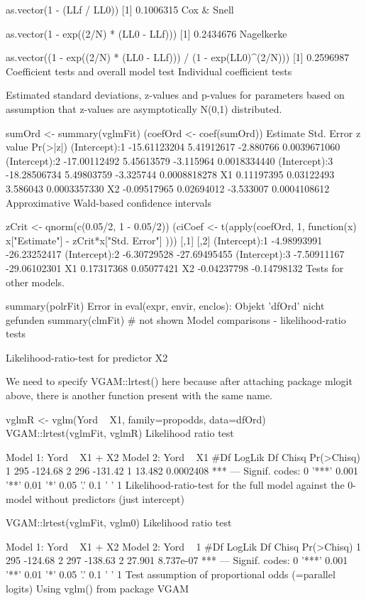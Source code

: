 as.vector(1 - (LLf / LL0))
[1] 0.1006315
Cox & Snell

as.vector(1 - exp((2/N) * (LL0 - LLf)))
[1] 0.2434676
Nagelkerke

as.vector((1 - exp((2/N) * (LL0 - LLf))) / (1 - exp(LL0)^(2/N)))
[1] 0.2596987
Coefficient tests and overall model test
Individual coefficient tests

Estimated standard deviations, z-values and p-values for parameters based on assumption that z-values are asymptotically N(0,1) distributed.

sumOrd   <- summary(vglmFit)
(coefOrd <- coef(sumOrd))
                  Estimate Std. Error   z value     Pr(>|z|)
(Intercept):1 -15.61123204 5.41912617 -2.880766 0.0039671060
(Intercept):2 -17.00112492 5.45613579 -3.115964 0.0018334440
(Intercept):3 -18.28506734 5.49803759 -3.325744 0.0008818278
X1              0.11197395 0.03122493  3.586043 0.0003357330
X2             -0.09517965 0.02694012 -3.533007 0.0004108612
Approximative Wald-based confidence intervals

zCrit   <- qnorm(c(0.05/2, 1 - 0.05/2))
(ciCoef <- t(apply(coefOrd, 1, function(x) x["Estimate"] - zCrit*x["Std. Error"] )))
                     [,1]         [,2]
(Intercept):1 -4.98993991 -26.23252417
(Intercept):2 -6.30729528 -27.69495455
(Intercept):3 -7.50911167 -29.06102301
X1             0.17317368   0.05077421
X2            -0.04237798  -0.14798132
Tests for other models.

summary(polrFit)
Error in eval(expr, envir, enclos): Objekt 'dfOrd' nicht gefunden
summary(clmFit)
# not shown
Model comparisons - likelihood-ratio tests

Likelihood-ratio-test for predictor X2

We need to specify VGAM::lrtest() here because after attaching package mlogit above, there is another function present with the same name.

vglmR <- vglm(Yord ~ X1, family=propodds, data=dfOrd)
VGAM::lrtest(vglmFit, vglmR)
Likelihood ratio test

Model 1: Yord ~ X1 + X2
Model 2: Yord ~ X1
  #Df  LogLik Df  Chisq Pr(>Chisq)    
1 295 -124.68                         
2 296 -131.42  1 13.482  0.0002408 ***
---
Signif. codes:  0 '***' 0.001 '**' 0.01 '*' 0.05 '.' 0.1 ' ' 1
Likelihood-ratio-test for the full model against the 0-model without predictors (just intercept)

VGAM::lrtest(vglmFit, vglm0)
Likelihood ratio test

Model 1: Yord ~ X1 + X2
Model 2: Yord ~ 1
  #Df  LogLik Df  Chisq Pr(>Chisq)    
1 295 -124.68                         
2 297 -138.63  2 27.901  8.737e-07 ***
---
Signif. codes:  0 '***' 0.001 '**' 0.01 '*' 0.05 '.' 0.1 ' ' 1
Test assumption of proportional odds (=parallel logits)
Using vglm() from package VGAM

